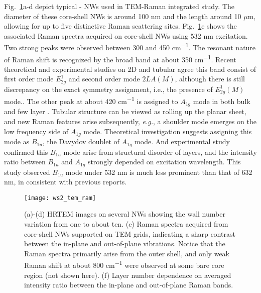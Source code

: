Fig.~\ref{fig:ch5ws2ram}a-d depict typical - NWs used in TEM-Raman integrated study. The diameter of these core-shell NWs is around 100 nm and the length around 10 $\mu$m, allowing for up to five distinctive Raman scattering sites. Fig.~\ref{fig:ch5ws2ram}e shows the associated Raman spectra acquired on core-shell NWs using 532 nm excitation. Two strong peaks were observed between 300 and 450 \si{cm^{-1}}. The resonant nature\cite{Stacy1985} of Raman shift is recognized by the broad band at about 350 \si{cm^{-1}}.  Recent theoretical\cite{Molina-Sanchez2011} and experimental\cite{Staiger2012} studies on 2D and tubular  agree this band consist of first order mode $E_{2g}^1$ and second order mode $2LA(M)$, although there is still discrepancy on the exact symmetry assignment, i.e., the presence of $E_{2g}^1(M)$ mode.\cite{Berkdemir2013,Peimyoo2013}. The other peak at about 420 \si{cm^{-1}} is assigned to $A_{1g}$ mode in both bulk\cite{Sekine1980} and few layer . Tubular  structure can be viewed as rolling up the planar  sheet, and new Raman features arise subsequently, \emph{e.g.}, a shoulder mode emerges on the low frequency side of $A_{1g}$ mode. Theoretical investigation suggests assigning this mode as $B_{1u}$, the Davydov doublet of $A_{1g}$ mode.\cite{Ataca2012} And experimental study confirmed this $B_{1u}$ mode arise from structural disorder of  layers, and the intensity ratio between $B_{1u}$ and $A_{1g}$ strongly depended on excitation wavelength.\cite{Staiger2012} This study observed $B_{1u}$ mode under 532 nm is much less prominent than that of 632 nm, in consistent with previous reports.\cite{Krause2009,Krause2009a} 

\begin{figure}[htb]
\centering
\texttt{[image: ws2\_tem\_ram]}
\caption[TEM-Raman integrated characterization on core-shell NWs]{(a)-(d) HRTEM images on several NWs showing the  wall number variation from one to about ten. (e) Raman spectra acquired from core-shell NWs supported on TEM grids, indicating a sharp contrast between the in-plane and out-of-plane vibrations. Notice that the Raman spectra primarily arise from the outer  shell, and only weak Raman shift at about 800 \si{cm^{-1}} were observed at some bare core region (not shown here). (f) Layer number dependence on averaged intensity ratio between the in-plane and out-of-plane Raman bands. }
\label{fig:ch5ws2ram}
\end{figure}

